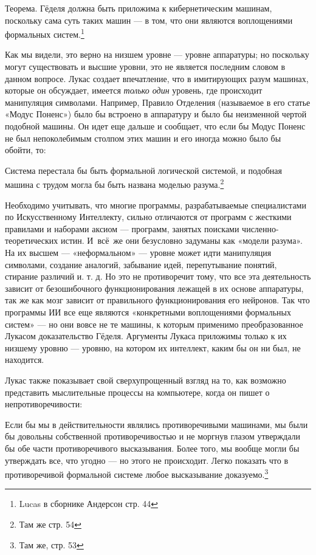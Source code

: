 \documentclass[../main.tex]{subfiles}
\begin{document}
Теорема. Гёделя должна быть приложима к кибернетическим машинам, поскольку сама суть таких машин --- в том, что они являются воплощениями формальных систем.\footnote{Lucas в сборнике Андерсон стр. 44}

Как мы видели, это верно на низшем уровне --- уровне аппаратуры; но поскольку могут существовать и высшие уровни, это не является последним словом в данном вопросе. Лукас создает впечатление, что в имитирующих разум машинах, которые он обсуждает, имеется \emph{только один} уровень, где происходит манипуляция символами. Например, Правило Отделения (называемое в его статье «Модус Поненс») было бы встроено в аппаратуру и было бы неизменной чертой подобной машины. Он идет еще дальше и сообщает, что если бы Модус Поненс не был непоколебимым столпом этих машин и его иногда можно было бы обойти, то:

Система перестала бы быть формальной логической системой, и подобная машина с трудом могла бы быть названа моделью разума.\footnote{Там же стр. 54}

Необходимо учитывать, что многие программы, разрабатываемые специалистами по Искусственному Интеллекту, сильно отличаются от программ с жесткими правилами и наборами аксиом --- программ, занятых поисками численно-теоретических истин. И~всё~же они безусловно задуманы как «модели разума». На их высшем --- «неформальном» --- уровне может идти манипуляция символами, создание аналогий, забывание идей, перепутывание понятий, стирание различий и. т. д. Но это не противоречит тому, что все эта деятельность зависит от безошибочного функционирования лежащей в их основе аппаратуры, так же как мозг зависит от правильного функционирования его нейронов. Так что программы ИИ все еще являются «конкретными воплощениями формальных систем» --- но они вовсе не те машины, к которым применимо преобразованное Лукасом доказательство Гёделя. Аргументы Лукаса приложимы только к их низшему уровню --- уровню, на котором их интеллект, каким бы он ни был, не находится.

Лукас также показывает свой сверхупрощенный взгляд на то, как возможно представить мыслительные процессы на компьютере, когда он пишет о непротиворечивости:

Если бы мы в действительности являлись противоречивыми машинами, мы были бы довольны собственной противоречивостью и не моргнув глазом утверждали бы обе части противоречивого высказывания. Более того, мы вообще могли бы утверждать все, что угодно --- но этого не происходит. Легко показать что в противоречивой формальной системе любое высказывание доказуемо.\footnote{Там же, стр. 53}
\end{document}
